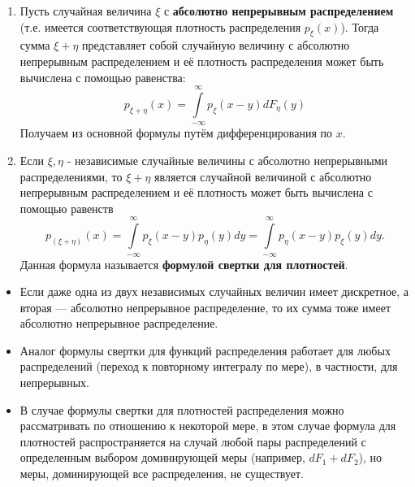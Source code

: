 \begin{corollary}\leavevmode \vspace*{-\bigskipamount}\vspace*{-\medskipamount}
	\begin{enumerate}
		\item Пусть случайная величина $\xi$ с \textbf{абсолютно непрерывным распределением} (т.е. имеется соответствующая плотность распределения $p_{\xi} (x)$). Тогда сумма $\xi + \eta$ представляет собой случайную величину с абсолютно непрерывным распределением и её плотность распределения может быть вычислена с помощью равенства:
		\[ p_{\xi + \eta} (x) = \int\limits_{-\infty}^{\infty} p_{\xi} (x - y) d F_{\eta} (y) \]
		Получаем из основной формулы путём дифференцирования по $x$.
		\item Если $\xi, \eta$ - независимые случайные величины с абсолютно непрерывными распределениями, то $\xi + \eta$ является случайной величиной с абсолютно непрерывным распределением и её плотность может быть вычислена с помощью равенств
		\[ p_{(\xi + \eta)} (x) = \int\limits_{-\infty}^{\infty} p_{\xi} (x - y) p_{\eta} (y) dy = \int\limits_{-\infty}^{\infty} p_{\eta} (x - y) p_{\xi} (y) dy. \]
		Данная формула называется \textbf{формулой свертки для плотностей}.
	\end{enumerate}
\end{corollary}

\begin{remark}\leavevmode \vspace*{-\medskipamount}
	\begin{itemize}
		\item Если даже одна из двух независимых случайных величин имеет дискретное, а вторая — абсолютно непрерывное распределение, то их сумма тоже имеет абсолютно непрерывное распределение.
		\item Аналог формулы свертки для функций распределения работает для любых распределений (переход к повторному интегралу по мере), в частности, для непрерывных. 
		\item В случае формулы свертки для плотностей  распределения можно рассматривать по отношению к некоторой мере, в этом случае формула для плотностей распространяется на случай любой пары распределений с определенным выбором доминирующей меры (например, $dF_1+dF_2$), но меры, доминирующей все распределения, не существует.
	\end{itemize}
\end{remark}

